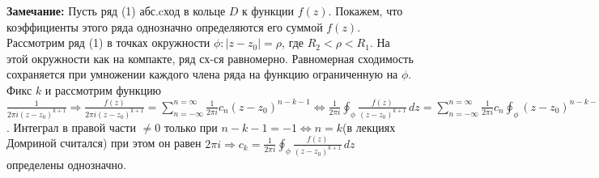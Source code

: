 \documentclass{article}
\begin{document}
\textbf{Замечание:} Пусть ряд (1) абс.cход в кольце $D$ к функции $f(z)$. Покажем, что коэффициенты этого ряда однозначно определяются его суммой $f(z)$. Рассмотрим ряд (1) в точках окружности $\phi: |z-z_0|=\rho$, где $R_2<\rho<R_1$. На этой окружности как на компакте, ряд сх-ся равномерно. Равномерная сходимость сохраняется при умножении каждого члена ряда на функцию ограниченную на $\phi$. Фикс $k$ и рассмотрим функцию $\frac{1}{2\pi i(z-z_0)^{k+1}} \Rightarrow \frac{f(z)}{2\pi i(z-z_0)^{k+1}} = \sum_{n=-\infty}^{n=\infty}\frac{1}{2\pi i}c_n(z-z_0)^{n-k-1} \Longleftrightarrow \frac{1}{2\pi i} \oint_\phi \frac{f(z)}{(z-z_0)^{k+1}} \,dz = \sum_{n=-\infty}^{n=\infty}\frac{1}{2\pi i}c_n\oint_\phi(z-z_0)^{n-k-1} \,dz$. Интеграл в правой части $\neq0$ только при $n-k-1=-1 \Longleftrightarrow n=k$(в лекциях Домриной считался) при этом он равен $2\pi i \Rightarrow c_k = \frac{1}{2\pi i} \oint_\phi \frac{f(z)}{(z-z_0)^{k+1}} \,dz$ определены однозначно.
\end{document}
